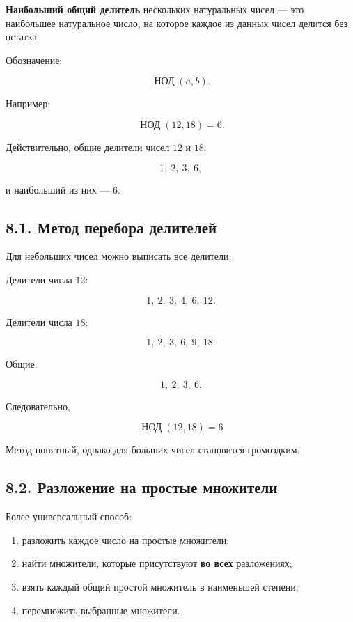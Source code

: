 \documentclass[a4paper,12pt]{article}
\begin{document}
\textbf{Наибольший общий делитель} нескольких натуральных чисел ---
это наибольшее натуральное число, на которое каждое из данных чисел
делится без остатка.

Обозначение:

\[
\operatorname{НОД}(a,b).
\]

Например:

\[
\operatorname{НОД}(12,18)=6.
\]

Действительно, общие делители чисел \(12\) и \(18\):

\[
1,\ 2,\ 3,\ 6,
\]

и наибольший из них --- \(6\).

\subsection*{\color{accent}8.1. Метод перебора делителей}

Для небольших чисел можно выписать все делители.

Делители числа \(12\):

\[
1,\ 2,\ 3,\ 4,\ 6,\ 12.
\]

Делители числа \(18\):

\[
1,\ 2,\ 3,\ 6,\ 9,\ 18.
\]

Общие:

\[
1,\ 2,\ 3,\ 6.
\]

Следовательно,

\[
\boxed{\operatorname{НОД}(12,18)=6}
\]

Метод понятный, однако для больших чисел становится громоздким.

\subsection*{\color{accent}8.2. Разложение на простые множители}

Более универсальный способ:

\begin{enumerate}[leftmargin=8mm]
    \item разложить каждое число на простые множители;
    \item найти множители, которые присутствуют \textbf{во всех} разложениях;
    \item взять каждый общий простой множитель в наименьшей степени;
    \item перемножить выбранные множители.
\end{enumerate}
\end{document}
